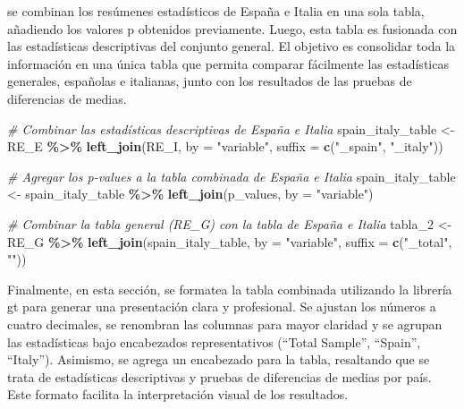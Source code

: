 \documentclass[
]{article}
\newenvironment{Shaded}{\begin{snugshade}}{\end{snugshade}}
\newcommand{\AttributeTok}[1]{\textcolor[rgb]{0.13,0.29,0.53}{#1}}
\newcommand{\CommentTok}[1]{\textcolor[rgb]{0.56,0.35,0.01}{\textit{#1}}}
\newcommand{\FunctionTok}[1]{\textcolor[rgb]{0.13,0.29,0.53}{\textbf{#1}}}
\newcommand{\NormalTok}[1]{#1}
\newcommand{\OtherTok}[1]{\textcolor[rgb]{0.56,0.35,0.01}{#1}}
\newcommand{\SpecialCharTok}[1]{\textcolor[rgb]{0.81,0.36,0.00}{\textbf{#1}}}
\newcommand{\StringTok}[1]{\textcolor[rgb]{0.31,0.60,0.02}{#1}}
\begin{document}
se combinan los resúmenes estadísticos de España e Italia en una sola
tabla, añadiendo los valores p obtenidos previamente. Luego, esta tabla
es fusionada con las estadísticas descriptivas del conjunto general. El
objetivo es consolidar toda la información en una única tabla que
permita comparar fácilmente las estadísticas generales, españolas e
italianas, junto con los resultados de las pruebas de diferencias de
medias.

\begin{Shaded}
\begin{Highlighting}[]
\CommentTok{\# Combinar las estadísticas descriptivas de España e Italia}
\NormalTok{spain\_italy\_table }\OtherTok{\textless{}{-}}\NormalTok{ RE\_E }\SpecialCharTok{\%\textgreater{}\%}
  \FunctionTok{left\_join}\NormalTok{(RE\_I, }\AttributeTok{by =} \StringTok{"variable"}\NormalTok{, }\AttributeTok{suffix =} \FunctionTok{c}\NormalTok{(}\StringTok{"\_spain"}\NormalTok{, }\StringTok{"\_italy"}\NormalTok{))}

\CommentTok{\# Agregar los p{-}values a la tabla combinada de España e Italia}
\NormalTok{spain\_italy\_table }\OtherTok{\textless{}{-}}\NormalTok{ spain\_italy\_table }\SpecialCharTok{\%\textgreater{}\%}
  \FunctionTok{left\_join}\NormalTok{(p\_values, }\AttributeTok{by =} \StringTok{"variable"}\NormalTok{)}

\CommentTok{\# Combinar la tabla general (RE\_G) con la tabla de España e Italia}
\NormalTok{tabla\_2 }\OtherTok{\textless{}{-}}\NormalTok{ RE\_G }\SpecialCharTok{\%\textgreater{}\%}
  \FunctionTok{left\_join}\NormalTok{(spain\_italy\_table, }\AttributeTok{by =} \StringTok{"variable"}\NormalTok{, }\AttributeTok{suffix =} \FunctionTok{c}\NormalTok{(}\StringTok{"\_total"}\NormalTok{, }\StringTok{""}\NormalTok{))}
\end{Highlighting}
\end{Shaded}

Finalmente, en esta sección, se formatea la tabla combinada utilizando
la librería gt para generar una presentación clara y profesional. Se
ajustan los números a cuatro decimales, se renombran las columnas para
mayor claridad y se agrupan las estadísticas bajo encabezados
representativos (``Total Sample'', ``Spain'', ``Italy''). Asimismo, se
agrega un encabezado para la tabla, resaltando que se trata de
estadísticas descriptivas y pruebas de diferencias de medias por país.
Este formato facilita la interpretación visual de los resultados.
\end{document}
